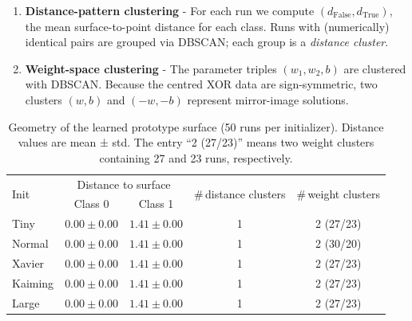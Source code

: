 \begin{enumerate}[label=(G\arabic*)]
    \item \textbf{Distance-pattern clustering} -  
          For each run we compute \((d_{\text{False}},d_{\text{True}})\),
          the mean surface-to-point distance for each class.
          Runs with (numerically) identical pairs are grouped via DBSCAN;
          each group is a \emph{distance cluster}.
    \item \textbf{Weight-space clustering} -  
          The parameter triples \((w_1,w_2,b)\) are clustered with DBSCAN.
          Because the centred XOR data are sign-symmetric, two clusters
          \((w,b)\) and \((-w,-b)\) represent mirror-image solutions.
\end{enumerate}

\begin{table}[h]
\centering
\caption{Geometry of the learned prototype surface (50 runs per
initializer).  Distance values are mean ± std.  The entry
“2 (27/23)” means two weight clusters containing 27 and 23 runs,
respectively.}
\label{tab:abs1-init-geometry}
\begin{tabular}{lcccc}
\toprule
\multirow{2}{*}{Init} &
\multicolumn{2}{c}{Distance to surface} &
\multirow{2}{*}{\#\,distance clusters} &
\multirow{2}{*}{\#\,weight clusters} \\
\cmidrule(lr){2-3}
 & Class 0 & Class 1 & & \\
\midrule
Tiny    & $0.00\pm0.00$ & $1.41\pm0.00$ & 1 & 2 (27/23) \\
Normal  & $0.00\pm0.00$ & $1.41\pm0.00$ & 1 & 2 (30/20) \\
Xavier  & $0.00\pm0.00$ & $1.41\pm0.00$ & 1 & 2 (27/23) \\
Kaiming & $0.00\pm0.00$ & $1.41\pm0.00$ & 1 & 2 (27/23) \\
Large   & $0.00\pm0.00$ & $1.41\pm0.00$ & 1 & 2 (27/23) \\
\bottomrule
\end{tabular}
\end{table}

